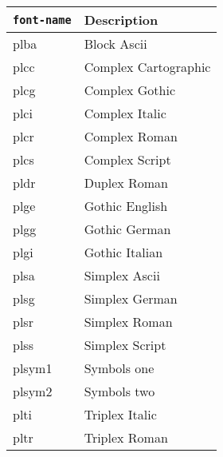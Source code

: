 {\begin{tabular}{ll} \hline
{\tt font-name} & Description \\ \hline
plba	&	Block Ascii \\
plcc 	& 	Complex Cartographic	\\
plcg 	& 	Complex Gothic	\\
plci 	& 	Complex Italic	\\
plcr 	& 	Complex Roman	\\
plcs 	& 	Complex Script	\\
pldr 	& 	Duplex Roman	\\
plge 	& 	Gothic English	\\
plgg 	& 	Gothic German	\\
plgi 	& 	Gothic Italian	\\
plsa 	& 	Simplex Ascii	\\
plsg 	& 	Simplex German	\\
plsr 	& 	Simplex Roman	\\
plss 	& 	Simplex Script	\\
plsym1 	& 	Symbols one	\\
plsym2 	& 	Symbols two	\\
plti 	& 	Triplex Italic	\\
pltr 	& 	Triplex Roman	\\
\hline
\end{tabular}

}
